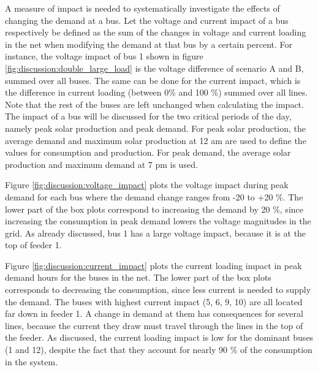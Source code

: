 \documentclass[class=book, crop=false, 11pt]{standalone}
\begin{document}
A measure of impact is needed to systematically investigate the effects of changing the demand at a bus. Let the voltage and current impact of a bus respectively be defined as the sum of the changes in voltage and current loading in the net when modifying the demand at that bus by a certain percent. For instance, the voltage impact of bus 1 shown in figure \ref{fig:discussion:double_large_load} is the voltage difference of scenario A and B, summed over all buses. The same can be done for the current impact, which is the difference in current loading (between 0\% and 100 \%) summed over all lines. Note that the rest of the buses are left unchanged when calculating the impact. The impact of a bus will be discussed for the two critical periods of the day, namely peak solar production and peak demand. For peak solar production, the average demand and maximum solar production at 12 am are used to define the values for consumption and production. For peak demand, the average solar production and maximum demand at 7 pm is used. 


Figure \ref{fig:discussion:voltage_impact} plots the voltage impact during peak demand for each bus where the demand change ranges from -20 to +20 \%. The lower part of the box plots correspond to increasing the demand by 20 \%, since increasing the consumption in peak demand lowers the voltage magnitudes in the grid. As already discussed, bus 1 has a large voltage impact, because it is at the top of feeder 1. 


Figure \ref{fig:discussion:current_impact} plots the current loading impact in peak demand hours for the buses in the net. The lower part of the box plots corresponds to decreasing the consumption, since less current is needed to supply the demand. The buses with highest current impact (5, 6, 9, 10) are all located far down in feeder 1. A change in demand at them has consequences for several lines, because the current they draw must travel through the lines in the top of the feeder. As discussed, the current loading impact is low for the dominant buses (1 and 12), despite the fact that they account for nearly 90 \% of the consumption in the system. 
\end{document}
